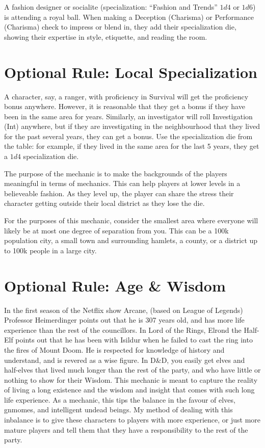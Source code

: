 \documentclass[twocolumn]{dndbook}
\begin{document}
A fashion designer or socialite (specialization: ``Fashion and Trends'' $1d4$ or $1d6$) is attending a royal ball.
When making a Deception (Charisma) or Performance (Charisma) check to impress or blend in, they add their specialization die, showing their expertise in style, etiquette, and reading the room.\par


\section{Optional Rule: Local Specialization}

A character, say, a ranger, with proficiency in Survival will get the proficiency bonus anywhere.
However, it is reasonable that they get a bonus if they have been in the same area for years.
Similarly, an investigator will roll Investigation (Int) anywhere, but if they are investigating in the neighbourhood that they lived for the past several years, they can get a bonus.
Use the specialization die from the table: for example, if they lived in the same area for the last 5 years, they get a $1d4$ specialization die.\par

The purpose of the mechanic is to make the backgrounds of the players meaningful in terms of mechanics.
This can help players at lower levels in a believeable fashion. As they level up, the player can share the stress their character getting outside their local district as they lose the die.\par

For the purposes of this mechanic, consider the smallest area where everyone will likely be at most one degree of separation from you.
This can be a 100k population city, a small town and surrounding hamlets, a county, or a district up to 100k people in a large city.\par

\section{Optional Rule: Age \& Wisdom}

In the first season of the Netflix show Arcane, (based on League of Legends) Professor Heimerdinger points out that he is 307 years old, and has more life experience than the rest of the councillors.
In Lord of the Rings, Elrond the Half-Elf points out that he has been with Isildur when he failed to cast the ring into the fires of Mount Doom. He is respected for knowledge of history and understand, and is revered as a wise figure.
In D\&D, you easily get elves and half-elves that lived much longer than the rest of the party, and who have little or nothing to show for their Wisdom.
This mechanic is meant to capture the reality of living a long existence and the wisdom and insight that comes with such long life experience.
As a mechanic, this tips the balance in the favour of elves, gnmomes, and intelligent undead beings.
My method of dealing with this inbalance is to give these characters to players with more experience, or just more mature players and tell them that they have a responsibility to the rest of the party.\par
\end{document}
